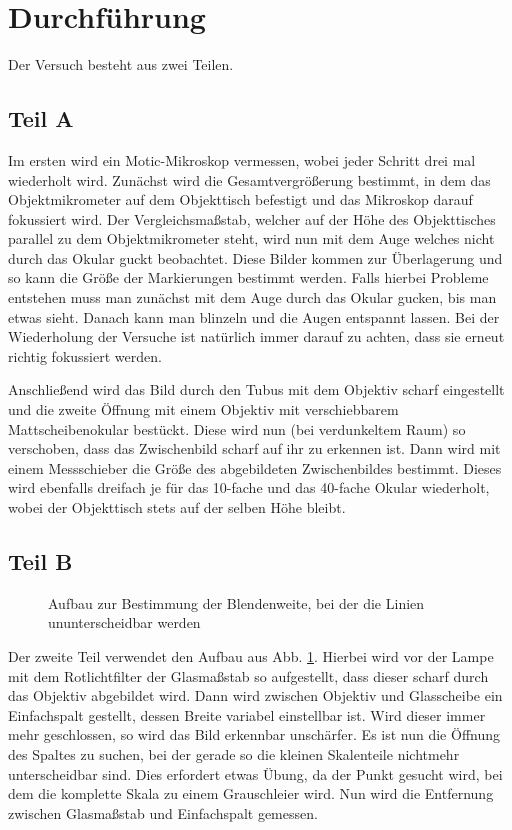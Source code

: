 \documentclass[12pt,a4paper,titlepage,headinclude,bibtotoc]{scrartcl}
\begin{document}
\section{Durchführung}
\label{sec:durchfuehrung}
Der Versuch besteht aus zwei Teilen.
\subsection{Teil A}
Im ersten wird ein Motic-Mikroskop vermessen, wobei jeder Schritt drei mal wiederholt wird.
Zunächst wird die Gesamtvergrößerung bestimmt, in dem das Objektmikrometer auf dem Objekttisch befestigt und das Mikroskop darauf fokussiert wird.
Der Vergleichsmaßstab, welcher auf der Höhe des Objekttisches parallel zu dem Objektmikrometer steht, wird nun mit dem Auge welches nicht durch das Okular guckt beobachtet.
Diese Bilder kommen zur Überlagerung und so kann die Größe der Markierungen bestimmt werden.
Falls hierbei Probleme entstehen muss man zunächst mit dem Auge durch das Okular gucken, bis man etwas sieht.
Danach kann man blinzeln und die Augen entspannt lassen.
Bei der Wiederholung der Versuche ist natürlich immer darauf zu achten, dass sie erneut richtig fokussiert werden.


Anschließend wird das Bild durch den Tubus mit dem Objektiv scharf eingestellt und die zweite Öffnung mit einem Objektiv mit verschiebbarem Mattscheibenokular bestückt.
Diese wird nun (bei verdunkeltem Raum) so verschoben, dass das Zwischenbild scharf auf ihr zu erkennen ist.
Dann wird mit einem Messschieber die Größe des abgebildeten Zwischenbildes bestimmt.
Dieses wird ebenfalls dreifach je für das 10-fache und das 40-fache Okular wiederholt, wobei der Objekttisch stets auf der selben Höhe bleibt.

\subsection{Teil B}
\begin{figure}[h]
\centering
\def\svgwidth{0.7\linewidth}

\caption{Aufbau zur Bestimmung der Blendenweite, bei der die Linien ununterscheidbar werden\protect\footnotemark}
\label{fig:aufbau2}
\end{figure}
Der zweite Teil verwendet den Aufbau aus Abb. \ref{fig:aufbau2}.
Hierbei wird vor der Lampe mit dem Rotlichtfilter der Glasmaßstab so aufgestellt, dass dieser scharf durch das Objektiv abgebildet wird.
Dann wird zwischen Objektiv und Glasscheibe ein Einfachspalt gestellt, dessen Breite variabel einstellbar ist.
Wird dieser immer mehr geschlossen, so wird das Bild erkennbar unschärfer.
Es ist nun die Öffnung des Spaltes zu suchen, bei der gerade so die kleinen Skalenteile nichtmehr unterscheidbar sind.
Dies erfordert etwas Übung, da der Punkt gesucht wird, bei dem die komplette Skala zu einem Grauschleier wird.
Nun wird die Entfernung zwischen Glasmaßstab und Einfachspalt gemessen.
\end{document}
